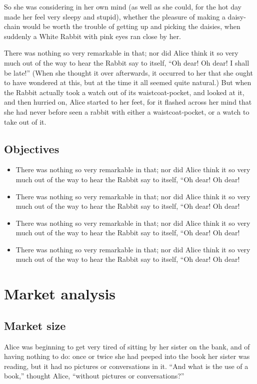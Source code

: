 \documentclass[12pt]{article}
\begin{document}
So she was considering in her own mind (as well as she could, for the hot day made her feel very sleepy and stupid), whether the pleasure of making a daisy-chain would be worth the trouble of getting up and picking the daisies, when suddenly a White Rabbit with pink eyes ran close by her.

There was nothing so very remarkable in that; nor did Alice think it so very much out of the way to hear the Rabbit say to itself, ``Oh dear! Oh dear! I shall be late!'' (When she thought it over afterwards, it occurred to her that she ought to have wondered at this, but at the time it all seemed quite natural.) But when the Rabbit actually took a watch out of its waistcoat-pocket, and looked at it, and then hurried on, Alice started to her feet, for it flashed across her mind that she had never before seen a rabbit with either a waistcoat-pocket, or a watch to take out of it. 

\subsection{Objectives}
\label{sec-2-5}
\begin{itemize}
\item There was nothing so very remarkable in that; nor did Alice think it so very much out of the way to hear the Rabbit say to itself, ``Oh dear! Oh dear!
\item There was nothing so very remarkable in that; nor did Alice think it so very much out of the way to hear the Rabbit say to itself, ``Oh dear! Oh dear!
\item There was nothing so very remarkable in that; nor did Alice think it so very much out of the way to hear the Rabbit say to itself, ``Oh dear! Oh dear!
\item There was nothing so very remarkable in that; nor did Alice think it so very much out of the way to hear the Rabbit say to itself, ``Oh dear! Oh dear!
\end{itemize}

\section{Market analysis}
\label{sec-3}

\subsection{Market size}
\label{sec-3-1}
Alice was beginning to get very tired of sitting by her sister on the bank, and of having nothing to do: once or twice she had peeped into the book her sister was reading, but it had no pictures or conversations in it. ``And what is the use of a book,'' thought Alice, ``without pictures or conversations?'' 
\end{document}

